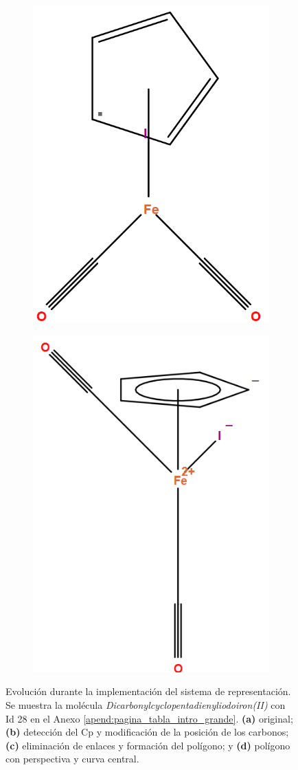 \begin{figure}[h]
\begin{subfigure}{.35\textwidth}
  \centering
  \includegraphics[width=.55\linewidth]{imagenes/resultados/evolucion_iron_c.png}
  \caption{}
\end{subfigure}%
\begin{subfigure}{.35\textwidth}
  \centering
  \includegraphics[width=.5\linewidth]{imagenes/resultados/moleculas/iron(II).png}
  \caption{}
  \label{fig:evolucion_iron_d}
\end{subfigure}%
\caption{Evolución durante la implementación del sistema de representación. Se muestra la molécula \textit{Dicarbonylcyclopentadienyliodoiron(II)} con Id 28 en el Anexo \ref{apend:pagina_tabla_intro_grande}. \textbf{(a)} original; \textbf{(b)} detección del Cp y modificación de la posición de los carbonos; \textbf{(c)} eliminación de enlaces y formación del polígono; y \textbf{(d)} polígono con perspectiva y curva central.}
\label{fig:evolucion_iron}
\end{figure}


